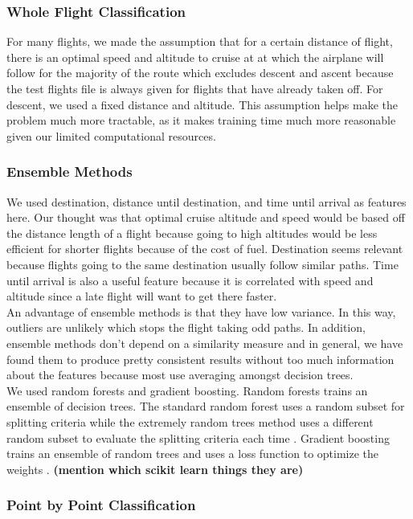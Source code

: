 \documentclass{article}[12pt]
\begin{document}
\begin{multicols}{2}
\subsubsection{Whole Flight Classification}
For many flights, we made the assumption that for a certain distance of flight, there is an optimal speed and altitude to cruise at at which the airplane will follow for the majority of the route which excludes descent and ascent because the test flights file is always given for flights that have already taken off. For descent, we used a fixed distance and altitude. This assumption helps make the problem much more tractable, as it makes training time much more reasonable given our limited computational resources.

\subsubsection{Ensemble Methods}
We used destination, distance until destination, and time until arrival as features here. Our thought was that optimal cruise altitude and speed would be based off the distance length of a flight because going to high altitudes would be less efficient for shorter flights because of the cost of fuel. Destination seems relevant because flights going to the same destination usually follow similar paths. Time until arrival is also a useful feature because it is correlated with speed and altitude since a late flight will want to get there faster.
\\

An advantage of ensemble methods is that they have low variance. In this way, outliers are unlikely which stops the flight taking odd paths. In addition, ensemble methods don't depend on a similarity measure and in general, we have found them to produce pretty consistent results without too much information about the features because most use averaging amongst decision trees.\\

We used random forests and gradient boosting. Random forests trains an ensemble of decision trees. The standard random forest uses a random subset for splitting criteria while the extremely random trees method uses a different random subset to evaluate the splitting criteria each time \cite{randomforest}. Gradient boosting trains an ensemble of random trees and uses a loss function to optimize the weights \cite{gradientboost}. 
\textbf{(mention which scikit learn things they are)}

\subsubsection{Point by Point Classification}


\end{multicols}
\end{document}
